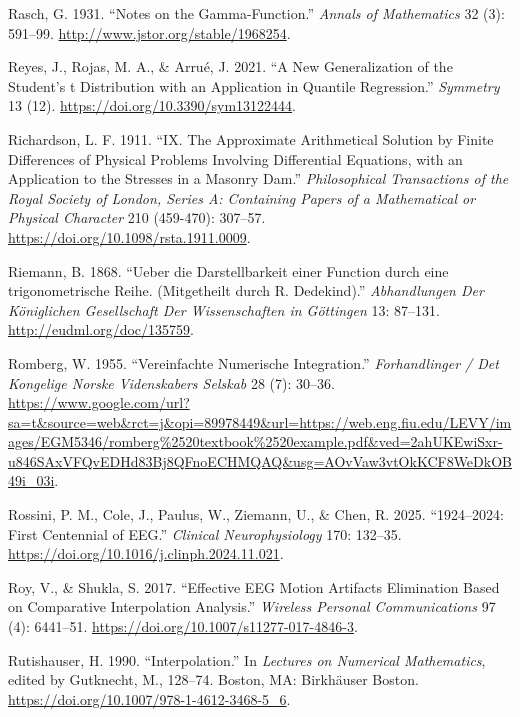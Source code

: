 \documentclass[
]{article}
\newlength{\cslhangindent}
\newlength{\cslentryspacingunit} %
\newenvironment{CSLReferences}[2] %
 {%
  \setlength{\parindent}{0pt}
  \ifodd #1
  \let\oldpar\par
  \def\par{\hangindent=\cslhangindent\oldpar}
  \fi
  \setlength{\parskip}{#2\cslentryspacingunit}
 }%
 {}
\begin{document}
\begin{CSLReferences}{1}{0}
\leavevmode{}%
Rasch, G. 1931. {``Notes on the Gamma-Function.''} \emph{Annals of
Mathematics} 32 (3): 591--99. \url{http://www.jstor.org/stable/1968254}.

\leavevmode{}%
Reyes, J., Rojas, M. A., \& Arrué, J. 2021. {``{A New Generalization of
the Student's t Distribution with an Application in Quantile
Regression}.''} \emph{Symmetry} 13 (12).
\url{https://doi.org/10.3390/sym13122444}.

\leavevmode{}%
Richardson, L. F. 1911. {``IX. The Approximate Arithmetical Solution by
Finite Differences of Physical Problems Involving Differential
Equations, with an Application to the Stresses in a Masonry Dam.''}
\emph{Philosophical Transactions of the Royal Society of London, Series
A: Containing Papers of a Mathematical or Physical Character} 210
(459-470): 307--57. \url{https://doi.org/10.1098/rsta.1911.0009}.

\leavevmode{}%
Riemann, B. 1868. {``{Ueber die Darstellbarkeit einer Function durch
eine trigonometrische Reihe. (Mitgetheilt durch R. Dedekind)}.''}
\emph{Abhandlungen Der Königlichen Gesellschaft Der Wissenschaften in
Göttingen} 13: 87--131. \url{http://eudml.org/doc/135759}.

\leavevmode{}%
Romberg, W. 1955. {``Vereinfachte Numerische Integration.''}
\emph{Forhandlinger / Det Kongelige Norske Videnskabers Selskab} 28 (7):
30--36.
\url{https://www.google.com/url?sa=t\&source=web\&rct=j\&opi=89978449\&url=https://web.eng.fiu.edu/LEVY/images/EGM5346/romberg\%2520textbook\%2520example.pdf\&ved=2ahUKEwiSxr-u846SAxVFQvEDHd83Bj8QFnoECHMQAQ\&usg=AOvVaw3vtOkKCF8WeDkOB49i_03i}.

\leavevmode{}%
Rossini, P. M., Cole, J., Paulus, W., Ziemann, U., \& Chen, R. 2025.
{``1924--2024: First Centennial of EEG.''} \emph{Clinical
Neurophysiology} 170: 132--35.
\url{https://doi.org/10.1016/j.clinph.2024.11.021}.

\leavevmode{}%
Roy, V., \& Shukla, S. 2017. {``Effective EEG Motion Artifacts
Elimination Based on Comparative Interpolation Analysis.''}
\emph{Wireless Personal Communications} 97 (4): 6441--51.
\url{https://doi.org/10.1007/s11277-017-4846-3}.

\leavevmode{}%
Rutishauser, H. 1990. {``Interpolation.''} In \emph{Lectures on
Numerical Mathematics}, edited by Gutknecht, M., 128--74. Boston, MA:
Birkhäuser Boston. \url{https://doi.org/10.1007/978-1-4612-3468-5_6}.


\end{CSLReferences}
\end{document}
